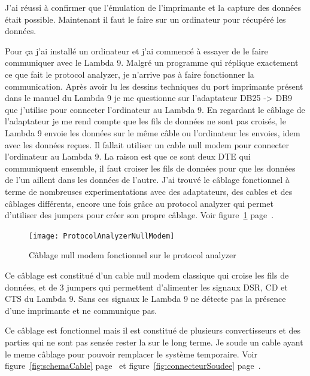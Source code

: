 \documentclass[12pt]{article}
\begin{document}
J'ai réussi à confirmer que l'émulation de l'imprimante et la capture des données était possible.
Maintenant il faut le faire sur un ordinateur pour récupéré les données.

Pour ça j'ai installé un ordinateur et j'ai commencé à essayer de le faire communiquer avec le Lambda 9.
Malgré un programme qui réplique exactement ce que fait le protocol analyzer, je n'arrive pas à faire fonctionner la communication.
Après avoir lu les dessins techniques du port imprimante présent dans le manuel du Lambda 9 je me questionne sur l'adaptateur DB25 -> DB9 que j'utilise pour connecter l'ordinateur au Lambda 9.
En regardant le câblage de l'adaptateur je me rend compte que les fils de données ne sont pas croisés, le Lambda 9 envoie les données sur le même câble ou l'ordinateur les envoies, idem avec les données reçues.
Il fallait utiliser un cable null modem pour connecter l'ordinateur au Lambda 9.
La raison est que ce sont deux DTE qui communiquent ensemble, il faut croiser les fils de données pour que les données de l'un aillent dans les données de l'autre.
J'ai trouvé le câblage fonctionnel à terme de nombreuses experimentations avec des adaptateurs, des cables et des câblages différents, encore une fois grâce au protocol analyzer qui permet d'utiliser des jumpers pour créer son propre câblage.
Voir figure~\ref{fig:cablageProtocolAnalyzer} page~\pageref{fig:cablageProtocolAnalyzer}.

\begin{figure}[h]
	\centering
	\texttt{[image: ProtocolAnalyzerNullModem]}
	\caption{Câblage null modem fonctionnel sur le protocol analyzer}
	\label{fig:cablageProtocolAnalyzer}
\end{figure}

Ce câblage est constitué d'un cable null modem classique qui croise les fils de données, et de 3 jumpers qui permettent d'alimenter les signaux DSR, CD et CTS du Lambda 9.
Sans ces signaux le Lambda 9 ne détecte pas la présence d'une imprimante et ne communique pas.

Ce câblage est fonctionnel mais il est constitué de plusieurs convertisseurs et des parties qui ne sont pas sensée rester la sur le long terme.
Je soude un cable ayant le meme câblage pour pouvoir remplacer le système temporaire.
Voir figure~\ref{fig:schemaCable} page~\pageref{fig:schemaCable} et figure~\ref{fig:connecteurSoudee} page~\pageref{fig:connecteurSoudee}.
\end{document}
